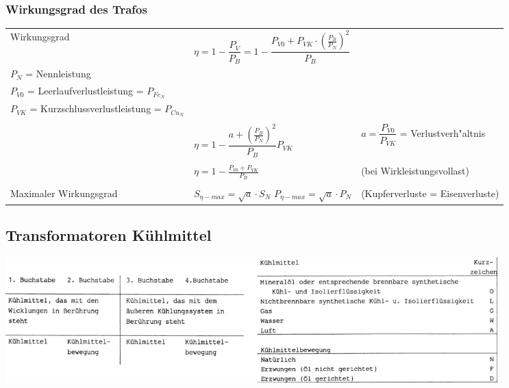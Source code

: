 		\subsubsection{Wirkungsgrad des Trafos}
			\begin{tabular}{p{4.5cm}p{7cm}p{7.5cm}}
            	Wirkungsgrad &
            		$\eta = 1- \dfrac{P_V}{P_B} = 1-\dfrac{P_{V0} + P_{VK} \cdot
            		(\frac{P_B}{P_N})^2}{P_B} $ &
            	\begin{minipage}{7cm}
                	$P_B$ = Betriebsnennleistung = $P_1$\\
                	$P_{N}$ = Nennleistung\\
                	$P_{V0}$ = Leerlaufverlustleistung = $P_{{Fe}_N}$\\
                	$P_{VK}$ = Kurzschlussverlustleistung = $P_{{Cu}_N}$             	
                \end{minipage}\\ \\
            	 &
            		$\eta = 1 - \dfrac{a + (\frac{P_B}{P_N})^2}{P_B} P_{VK}$ &
            	\begin{minipage}{7cm}
 					$a = \dfrac{P_{V0}}{P_{VK}}$ = Verlustverh"altnis                	
                \end{minipage}\\ \\            		
            	 &
            		$\eta = 1 - \frac{P_{V0}+P_{VK}}{P_B} $ 
            		& (bei Wirkleistungsvollast) \\ \\
            	Maximaler Wirkungsgrad
            	& $S_{\eta-max} = \sqrt{a} \cdot S_N$ \quad $P_{\eta-max} = \sqrt{a}
            	\cdot P_N$
            	& (Kupferverluste = Eisenverluste)
            \end{tabular}	

	\subsection{Transformatoren Kühlmittel}
		\begin{center}
	    	\includegraphics[width=19cm]{bilder/Kuehlmittel.png}
	    \end{center} 

